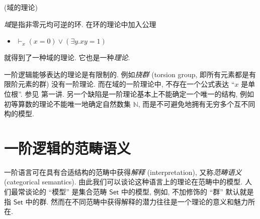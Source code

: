 
\begin{example}
	{(域的理论)}
	
	\emph{域}是指非零元均可逆的环. 在环的理论中加入公理
	\begin{itemize}
		\item $\vdash_x (x=0) \lor (\exists y. xy=1)$
	\end{itemize}
	就得到了一种域的理论\footnotemark. 它也是一种\emph{\coherent{}理论}.
\end{example}



\begin{remark}
	{}
	一阶逻辑能够表达的理论是有限制的. 例如\emph{挠群} (torsion group, 即所有元素都是有限阶元素的群) 没有一阶理论. 而在域的一阶理论中, 不存在一个公式表达 ``$x$ 是单位根''. 参见 \cite{Lurie-Categorical-Logic} 第一讲.
	另一个缺陷是一阶理论基本上不能确定一个唯一的结构, 例如初等算数的理论不能唯一地确定自然数集 $\mathbb{N}$, 而是不可避免地拥有无穷多个互不同构的模型.
\end{remark}

\section{一阶逻辑的范畴语义}

一阶语言可在具有合适结构的范畴中获得\emph{解释} (interpretation), 又称\emph{范畴语义} (categorical semantics).
由此我们可以谈论这种语言上的理论在范畴中的模型.
人们最常谈论的 ``模型'' 是集合范畴 $\mathsf{Set}$ 中的模型, 例如, 不加修饰的 ``群'' 默认就是指  $\mathsf{Set}$ 中的群. 然而在不同范畴中获得解释的潜力往往是一个理论的意义和魅力所在.


